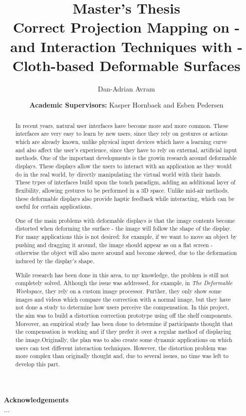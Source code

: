 \documentclass[]{article}
\title{\textbf{Master's Thesis} \\ Correct Projection Mapping on - and Interaction Techniques with - Cloth-based Deformable Surfaces}
\author{Dan-Adrian Avram}
\author{\textbf{Academic Supervisors:} Kasper Hornbaek and Esben Pedersen}
\begin{document}
\maketitle
\thispagestyle{empty}
\newpage
\begin{center}
{\LARGE \textbf{Acknowledgements}}\\
\bigskip
\bigskip
...
\end{center}

\maketitle
\thispagestyle{empty}
\newpage
\thispagestyle{empty}
\begin{abstract}

In recent years, natural user interfaces have become more and more common. These interfaces are very easy to learn by new users, since they rely on gestures or actions which are already known, unlike physical input devices which have a learning curve and also affect the user's experience, since they have to rely on external, artificial input methods. One of the important developments is the growin research around deformable displays. These displays allow the users to interact with an application as they would do in the real world, by directly manipulating the virtual world with their hands. These types of interfaces build upon the touch paradigm, adding an additional layer of flexibility, allowing gestures to be performed in a 3D space. Unlike mid-air methods, these deformable displays also provide haptic feedback while interacting, which can be useful for certain applications.  

One of the main problems with deformable displays is that the image contents become distorted when deforming the surface - the image will follow the shape of the display. For many applications this is not desired: for example, if we want to move an object by pushing and dragging it around, the image should appear as on a flat screen - otherwise the object will also move around and become skewed, due to the deformation induced by the display's shape.

While research has been  done in this area, to my knowledge, the problem is still not completely solved. Although the issue was addressed, for example, in \textit{The Deformable Workspace}, they rely on a custom image processor. Further, they only show some images and videos which compare the correction with a normal image, but they have not done a study to determine how users perceive the compensation. In this project, the aim was to build a distortion correction prototype using off the shelf components. Moreover, an empirical study has been done to determine if participants thought that the compensation is working and if they prefer it over a regular method of displaying the image.Originally, the plan was to also create some dynamic applications on which users can test different interaction techniques. However, the distortion problem was more complex than originally thought and, due to several issues, no time was left to develop this part. 


\end{abstract}
\end{document}
